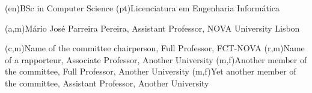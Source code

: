 \ntauthordegree(en){BSc in Computer Science}
\ntauthordegree(pt){Licenciatura em Engenharia Informática}


(a,m){Mário José Parreira Pereira, Assistant Professor, NOVA University Lisbon}

(c,m){Name of the committee chairperson, Full Professor, FCT-NOVA}
(r,m){Name of a rapporteur, Associate Professor, Another University}
(m,f){Another member of the committee, Full Professor, Another University}
(m,f){Yet another member of the committee, Assistant Professor, Another University}
